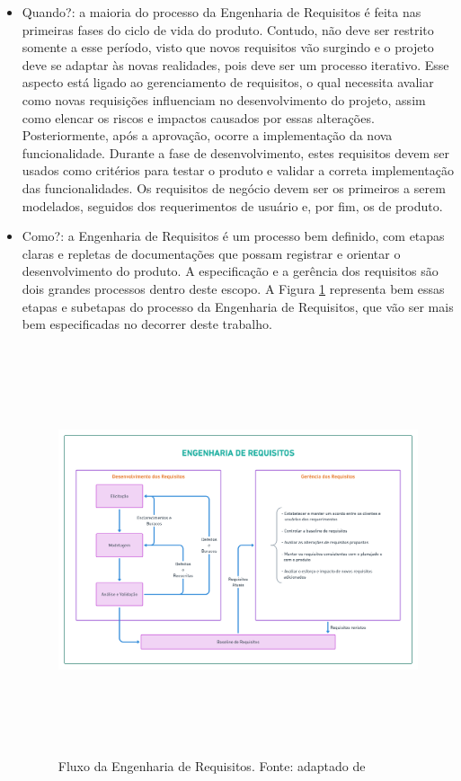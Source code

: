 \begin{itemize}
    \item Quando?: a maioria do processo da Engenharia de Requisitos é feita nas primeiras fases do ciclo de vida do produto. Contudo, não deve ser restrito somente a esse período, visto que novos requisitos vão surgindo e o projeto deve se adaptar às novas realidades, pois deve ser um processo iterativo. Esse aspecto está ligado ao gerenciamento de requisitos, o qual necessita avaliar como novas requisições influenciam no desenvolvimento do projeto, assim como elencar os riscos e impactos causados por essas alterações. Posteriormente, após a aprovação, ocorre a implementação da nova funcionalidade. Durante a fase de desenvolvimento, estes requisitos devem ser usados como critérios para testar o produto e validar a correta implementação das funcionalidades. Os requisitos de negócio devem ser os primeiros a serem modelados, seguidos dos requerimentos de usuário e, por fim, os de produto.
    
    \item Como?: a Engenharia de Requisitos é um processo bem definido, com etapas claras e repletas de documentações que possam registrar e orientar o desenvolvimento do produto. A especificação e a gerência dos requisitos são dois grandes processos dentro deste escopo. A Figura \ref{eng_req_flux} representa bem essas etapas e subetapas do processo da Engenharia de Requisitos, que vão ser mais bem especificadas no decorrer deste trabalho.
    
    \begin{figure}[htb]
        \begin{center}
            \includegraphics[width=12cm,height=12cm,keepaspectratio]{figuras/Introducao/eng_req_fluxo.png}
            \caption{{Fluxo da Engenharia de Requisitos. Fonte: adaptado de \cite{westfall_5w2h}}}
            \label{eng_req_flux}
        \end{center}
    \end{figure}
    
\end{itemize}

